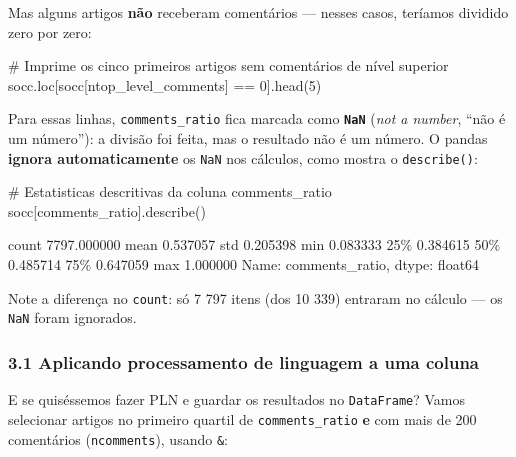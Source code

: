 \documentclass[
  brazilian,
  11pt,
]{article}
\newenvironment{Shaded}{\begin{snugshade}}{\end{snugshade}}
\newcommand{\CommentTok}[1]{\textcolor[rgb]{0.48,0.49,0.49}{#1}}
\newcommand{\DecValTok}[1]{\textcolor[rgb]{0.96,0.45,0.00}{#1}}
\newcommand{\NormalTok}[1]{\textcolor[rgb]{0.81,0.81,0.76}{#1}}
\newcommand{\OperatorTok}[1]{\textcolor[rgb]{0.81,0.81,0.76}{#1}}
\newcommand{\StringTok}[1]{\textcolor[rgb]{0.96,0.31,0.31}{#1}}
\let\oldtexttt\texttt
\renewcommand{\texttt}[1]{{\color{inlink}\oldtexttt{#1}}}
\begin{document}
Mas alguns artigos \textbf{não} receberam comentários --- nesses casos,
teríamos dividido zero por zero:

\begin{Shaded}
\begin{Highlighting}[]
\CommentTok{\# Imprime os cinco primeiros artigos sem comentários de nível superior}
\NormalTok{socc.loc[socc[}\StringTok{\textquotesingle{}ntop\_level\_comments\textquotesingle{}}\NormalTok{] }\OperatorTok{==} \DecValTok{0}\NormalTok{].head(}\DecValTok{5}\NormalTok{)}
\end{Highlighting}
\end{Shaded}

Para essas linhas, \texttt{comments\_ratio} fica marcada como
\textbf{\texttt{NaN}} (\emph{not a number}, ``não é um número''): a
divisão foi feita, mas o resultado não é um número. O pandas
\textbf{ignora automaticamente} os \texttt{NaN} nos cálculos, como
mostra o \texttt{describe()}:

\begin{Shaded}
\begin{Highlighting}[]
\CommentTok{\# Estatisticas descritivas da coluna \textquotesingle{}comments\_ratio\textquotesingle{}}
\NormalTok{socc[}\StringTok{\textquotesingle{}comments\_ratio\textquotesingle{}}\NormalTok{].describe()}
\end{Highlighting}
\end{Shaded}

\begin{Shaded}
\begin{Highlighting}[]
\NormalTok{count    7797.000000}
\NormalTok{mean        0.537057}
\NormalTok{std         0.205398}
\NormalTok{min         0.083333}
\NormalTok{25\%         0.384615}
\NormalTok{50\%         0.485714}
\NormalTok{75\%         0.647059}
\NormalTok{max         1.000000}
\NormalTok{Name: comments\_ratio, dtype: float64}
\end{Highlighting}
\end{Shaded}

Note a diferença no \texttt{count}: só 7 797 itens (dos 10 339) entraram
no cálculo --- os \texttt{NaN} foram ignorados.

\subsubsection{3.1 Aplicando processamento de linguagem a uma
coluna}\label{aplicando-processamento-de-linguagem-a-uma-coluna}

E se quiséssemos fazer PLN e guardar os resultados no
\texttt{DataFrame}? Vamos selecionar artigos no primeiro quartil de
\texttt{comments\_ratio} \textbf{e} com mais de 200 comentários
(\texttt{ncomments}), usando \texttt{\&}:
\end{document}
